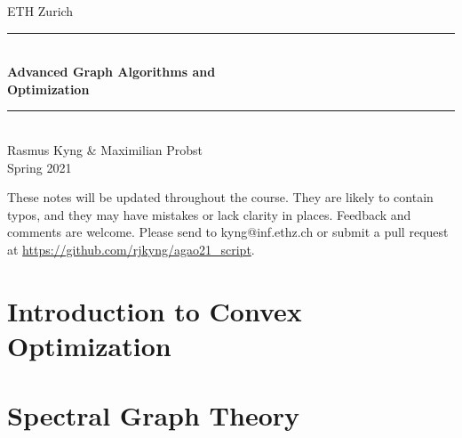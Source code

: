 \documentclass[12pt,a4paper,openany]{book}
\begin{document}
%
%
\begin{titlepage}

\newcommand{\HRule}{\rule{\linewidth}{0.5mm}} %
{\center

{\Large ETH Zurich}\\[1.5cm]
\HRule \\[0.4cm]
{ \huge \bfseries Advanced Graph Algorithms and \\ Optimization}\\[0.4cm] %
\HRule \\[1.5cm]

{\LARGE Rasmus Kyng \& Maximilian Probst}\\[2cm]


{\Large Spring 2021}\\[2cm] %

}
\vfill




\end{titlepage}

These notes will be updated throughout the course.
They are likely to contain typos, and they may have mistakes or
lack clarity in places. Feedback and comments are 
welcome. Please send to kyng@inf.ethz.ch or submit a pull request at
\url{https://github.com/rjkyng/agao21_script}.


\newpage

\tableofcontents





\label{part:intro}


\part{Introduction to Convex Optimization}
\label{part:convex}






\part{Spectral Graph Theory}
\label{part:sg}



% 
% 
% 
% 
% 
% 

% 
% 

% 
% 
\end{document}
